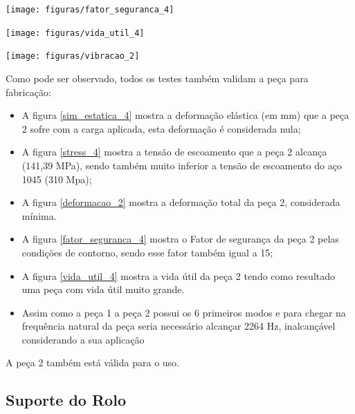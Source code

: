     \begin{center}
    	\texttt{[image: figuras/fator\_seguranca\_4]}
        \label{fator_seguranca_4}
    \end{center}
    
    \begin{center}
    	\texttt{[image: figuras/vida\_util\_4]}
        \label{vida_util_4}
    \end{center}

    \begin{center}
    	\texttt{[image: figuras/vibracao\_2]}
        \label{vibracao_2}
    \end{center}    

    Como pode ser observado, todos os testes também validam a peça para fabricação:
 
    \begin{itemize}
        \item A figura \ref{sim_estatica_4} mostra a deformação elástica (em mm) que a peça 2 sofre com a carga aplicada, esta deformação é considerada nula;
        \item A figura \ref{stress_4} mostra a tensão de escoamento que a peça 2 alcança (141,39 MPa), sendo também muito inferior a tensão de escoamento do aço 1045 (310 Mpa);
        \item A figura \ref{deformacao_2} mostra a deformação total da peça 2, considerada mínima.
        \item A figura \ref{fator_seguranca_4} mostra o Fator de segurança da peça 2 pelas condições de contorno, sendo esse fator também igual a 15;
        \item A figura \ref{vida_util_4} mostra a vida útil da peça 2 tendo como resultado uma peça com vida útil muito grande.
        \item Assim como a peça 1 a peça 2 possui os 6 primeiros modos e para chegar na frequência natural da peça seria necessário alcançar 2264 Hz, inalcançável considerando a sua aplicação
    \end{itemize}

A peça 2 também está válida para o uso.

\subsection{Suporte do Rolo}

